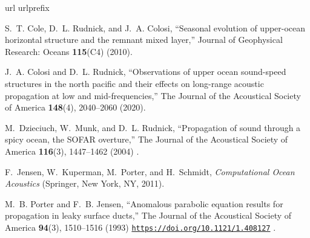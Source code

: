 \documentclass[preprint,NumberedRefs]{JASA}
\begin{document}

%
\begin{thebibliography}{10}
\def\enquote#1,{``#1,''}
\def\enxquote#1{``#1''}
\expandafter\ifx\csname url\endcsname\relax
  \def\url#1{\texttt{#1}}\fi
\expandafter\ifx\csname urlprefix\endcsname\relax\def\urlprefix{URL }\fi
\providecommand{\bibinfo}[2]{#2}
\def\plainquote#1{``#1''}
\providecommand{\noopsort}[1]{}
\providecommand{\switchargs}[2]{#2#1}
\providecommand{\dourl}[1]{\href{http://#1}{\nolinkurl{#1}}}
  \def\eatspace #1{#1}

\bibinfo{author}{S.~T. Cole}, \bibinfo{author}{D.~L. Rudnick}, and
  \bibinfo{author}{J.~A. Colosi}, \enquote{\bibinfo{title}{Seasonal evolution
  of upper-ocean horizontal structure and the remnant mixed layer}},
  \bibinfo{journal}{Journal of Geophysical Research: Oceans} \textbf{115}(C4)
  (\bibinfo{year}{2010}).

\bibinfo{author}{J.~A. Colosi} and \bibinfo{author}{D.~L. Rudnick},
  \enquote{\bibinfo{title}{Observations of upper ocean sound-speed structures
  in the north pacific and their effects on long-range acoustic propagation at
  low and mid-frequencies}},  \bibinfo{journal}{The Journal of the Acoustical
  Society of America} \textbf{148}(4), \bibinfo{pages}{2040--2060}
  (\bibinfo{year}{2020}).

\bibinfo{author}{M.~Dzieciuch}, \bibinfo{author}{W.~Munk}, and
  \bibinfo{author}{D.~L. Rudnick}, \enquote{\bibinfo{title}{Propagation of
  sound through a spicy ocean, the {SOFAR} overture}},  \bibinfo{journal}{The
  Journal of the Acoustical Society of America} \textbf{116}(3),
  \bibinfo{pages}{1447--1462} (\bibinfo{year}{2004}) .

\bibinfo{author}{F.~Jensen}, \bibinfo{author}{W.~Kuperman},
  \bibinfo{author}{M.~Porter}, and \bibinfo{author}{H.~Schmidt},
  \emph{\bibinfo{title}{Computational Ocean Acoustics}}
  (\bibinfo{publisher}{Springer, New York, NY}, \bibinfo{year}{2011}).

\bibinfo{author}{M.~B. Porter} and \bibinfo{author}{F.~B. Jensen},
  \enquote{\bibinfo{title}{Anomalous parabolic equation results for propagation
  in leaky surface ducts}},  \bibinfo{journal}{The Journal of the Acoustical
  Society of America} \textbf{94}(3), \bibinfo{pages}{1510--1516}
  (\bibinfo{year}{1993}) \dourl{https://doi.org/10.1121/1.408127}
  .


\end{thebibliography}
\end{document}
